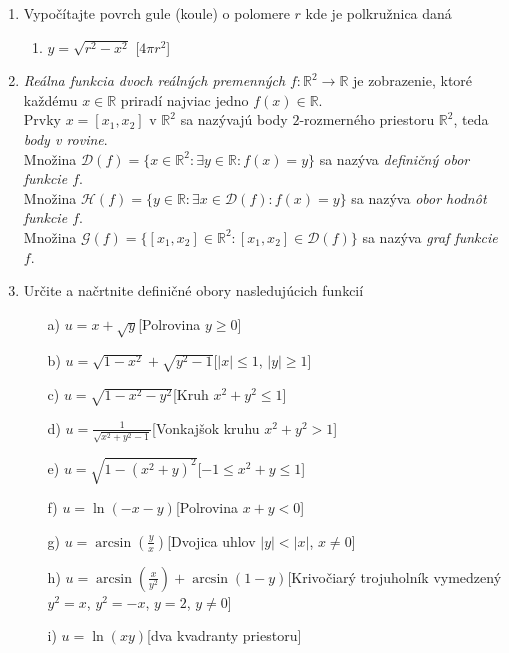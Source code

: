 \begin{enumerate}
\item Vypočítajte povrch gule (koule) o polomere $r$ kde je polkružnica daná 
\begin{enumerate}
\item{$y=\sqrt{r^2-x^2}$} \hspace{\fill} [$4\pi r^2$]
\end{enumerate}


\item \textit{Reálna funkcia dvoch reálných premenných} $f:\mathbb{R}^2 \to \mathbb{R}$ je zobrazenie, ktoré každému $x \in \mathbb{R}$ priradí najviac jedno $f(x) \in \mathbb{R}$. \\
Prvky $x=[x_1,x_2]$ v $\mathbb{R}^2$ sa nazývajú body $2$-rozmerného priestoru $\mathbb{R}^2$, teda \textit{body v rovine}.  \\
Množina $\mathcal{D}(f)=\{x \in \mathbb{R}^2: \exists y \in \mathbb{R}: f(x)=y\}$ sa nazýva \textit{definičný obor funkcie $f$}.\\
Množina $\mathcal{H}(f)=\{y \in \mathbb{R}: \exists x \in \mathcal{D}(f): f(x)=y\}$ sa nazýva \textit{obor hodnôt funkcie $f$}.\\
Množina $\mathcal{G}(f)=\{[x_1,x_2] \in \mathbb{R}^2: [x_1,x_2] \in \mathcal{D}(f)\}$ sa nazýva \textit{graf funkcie $f$}.


\item Určite a načrtnite definičné obory nasledujúcich funkcií

\begin{enumerate}
\item[a)]{$u=x+\sqrt{y}$}\hspace{\fill}[Polrovina $y\geq0$]
\item[b)]{$u=\sqrt{1-x^2}+\sqrt{y^2-1}$}\hspace{\fill}[$|x|\leq 1$, $|y|\geq 1$]
\item[c)]{$u=\sqrt{1-x^2-y^2}$}\hspace{\fill}[Kruh $x^2+y^2 \leq 1$]
\item[d)]{$u=\frac{1}{\sqrt{x^2+y^2-1}}$}\hspace{\fill}[Vonkajšok kruhu $x^2+y^2>1$]
\item[e)]{$u=\sqrt{1-(x^2+y)^2}$}\hspace{\fill}[$-1\leq x^2+y \leq 1$]
\item[f)]{$u=\ln(-x-y)$}\hspace{\fill}[Polrovina $x+y < 0$]
\item[g)]{$u=\arcsin(\frac{y}{x})$}\hspace{\fill}[Dvojica uhlov $|y|<|x|$, $x\neq 0$]
\item[h)]{$u=\arcsin(\frac{x}{y^2})+\arcsin(1-y)$}\hspace{\fill}[Krivočiarý trojuholník vymedzený $y^2=x$, $y^2=-x$, $y=2$, $y \neq 0$]
\item[i)]{$u=\ln(xy)$}\hspace{\fill}[dva kvadranty priestoru]
\end{enumerate}


\end{enumerate}
